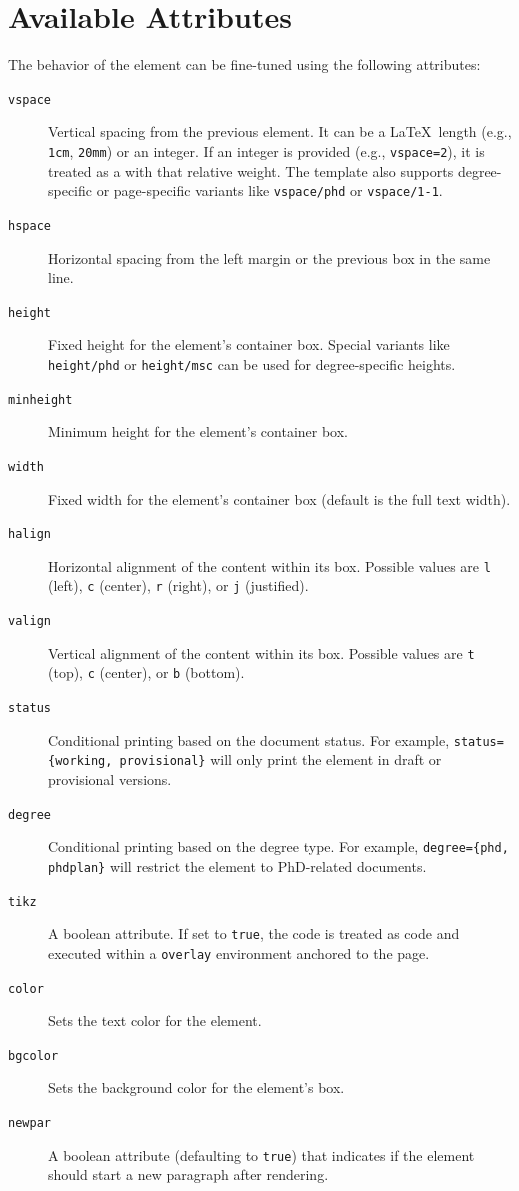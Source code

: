 \section{Available Attributes}
\label{sec:attributes}

The behavior of the element can be fine-tuned using the following attributes:

\begin{description}
  \item[\texttt{vspace}] Vertical spacing from the previous element. It can be a \LaTeX\ length (e.g., \texttt{1cm}, \texttt{20mm}) or an integer. If an integer is provided (e.g., \texttt{vspace=2}), it is treated as a \latexinline{\vfill} with that relative weight. The template also supports degree-specific or page-specific variants like \texttt{vspace/phd} or \texttt{vspace/1-1}.
  \item[\texttt{hspace}] Horizontal spacing from the left margin or the previous box in the same line.
  \item[\texttt{height}] Fixed height for the element's container box. Special variants like \texttt{height/phd} or \texttt{height/msc} can be used for degree-specific heights.
  \item[\texttt{minheight}] Minimum height for the element's container box.
  \item[\texttt{width}] Fixed width for the element's container box (default is the full text width).
  \item[\texttt{halign}] Horizontal alignment of the content within its box. Possible values are \texttt{l} (left), \texttt{c} (center), \texttt{r} (right), or \texttt{j} (justified).
  \item[\texttt{valign}] Vertical alignment of the content within its box. Possible values are \texttt{t} (top), \texttt{c} (center), or \texttt{b} (bottom).
  \item[\texttt{status}] Conditional printing based on the document status. For example, \texttt{status=\{working, provisional\}} will only print the element in draft or provisional versions.
  \item[\texttt{degree}] Conditional printing based on the degree type. For example, \texttt{degree=\{phd, phdplan\}} will restrict the element to PhD-related documents.
  \item[\texttt{tikz}] A boolean attribute. If set to \texttt{true}, the code is treated as \latexinline{\TikZ} code and executed within a \latexinline{\TikZ} \texttt{overlay} environment anchored to the page.
  \item[\texttt{color}] Sets the text color for the element.
  \item[\texttt{bgcolor}] Sets the background color for the element's box.
  \item[\texttt{newpar}] A boolean attribute (defaulting to \texttt{true}) that indicates if the element should start a new paragraph after rendering.
\end{description}

